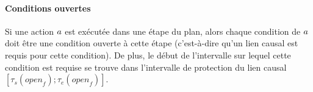 



\paragraph*{Conditions ouvertes} Si une action $a$ est ex\'{e}cut\'{e}e dans une \'{e}tape du plan, alors chaque condition de $a$ doit \^{e}tre une condition ouverte \`{a} cette \'{e}tape (c'est-\`{a}-dire qu'un lien causal est requis pour cette condition). De plus, le d\'{e}but de l'intervalle sur lequel cette condition est requise se trouve dans l'intervalle de protection du lien causal $[\tau_{s}(\textit{open}_{f});\tau_{e}(\textit{open}_{f})]$.

